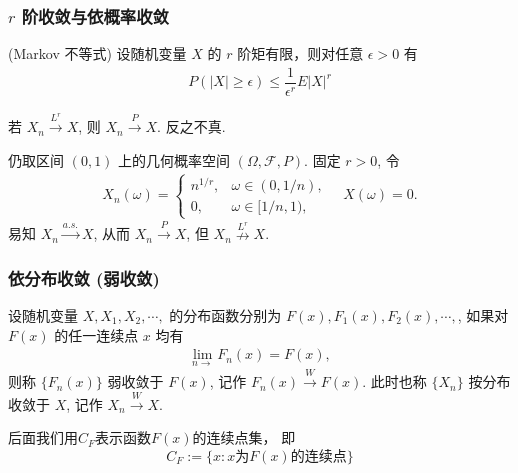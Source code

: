 \documentclass[Prob-All.tex]{subfiles}
\begin{document}
\begin{frame}
	\frametitle{$r$ 阶收敛与依概率收敛}
	\begin{lem}
		({\rm Markov} 不等式) 设随机变量 $X$ 的 $r$ 阶矩有限，则对任意 $\epsilon>0$ 有
		\begin{eqnarray*}
			P(|X|\geq  \epsilon)\leq \dfrac{1}{\epsilon^r}E|X|^r
		\end{eqnarray*}

	\end{lem}


	\pause
	\begin{thm}
		若 $X_n\stackrel{L^r}{\rightarrow} X$, 则 $X_n\stackrel{P}{\rightarrow} X$. 反之不真.
	\end{thm}


	\pause

	\begin{exam}
		仍取区间 $(0,1)$ 上的几何概率空间 $(\Omega,\mathcal{F}, P)$. 固定 $r>0$, 令
		\begin{eqnarray*}
			X_n(\omega)=\left\{
			\begin{array}{ll}
				n^{1/r},&\omega\in (0, 1/n),\\
				0, &\omega\in [1/n,1),
			\end{array}
			\right. \quad X(\omega)=0.
		\end{eqnarray*}
		易知 $X_n\stackrel{a.s.}{\rightarrow} X$, 从而 $X_n\stackrel{P}{\rightarrow} X$, 但 $X_n\stackrel{L^r}{\nrightarrow} X$.
	\end{exam}
\end{frame}




\begin{frame}
	\frametitle{依分布收敛 (弱收敛)}
	\begin{defi}
		设随机变量 $X,X_1, X_2,\cdots,$ 的分布函数分别为 $F (x), F_1 (x),F_2 (x),\cdots,$, 如果对 $F (x)$ 的任一连续点 $x$ 均有
		\begin{eqnarray}\label{eq:weakdefn}
			\lim_{n\rightarrow}F_n(x)=F(x),
		\end{eqnarray}
		则称 $\{F_n (x)\}$ 弱收敛于 $F (x)$, 记作 $F_n (x)\stackrel{W}{\rightarrow} F (x)$. 此时也称 $\{X_n\}$ 按分布收敛于 $X$, 记作 $X_n\stackrel{W}{\rightarrow} X$.
	\end{defi}
	\pause
	\begin{rmk}
	后面我们用$C_F$表示函数$F(x)$的连续点集， 即
	\[C_F:=\{x: x\mbox{为}F(x)\mbox{的连续点}  \}\]
	\end{rmk}

\end{frame}
\end{document}
